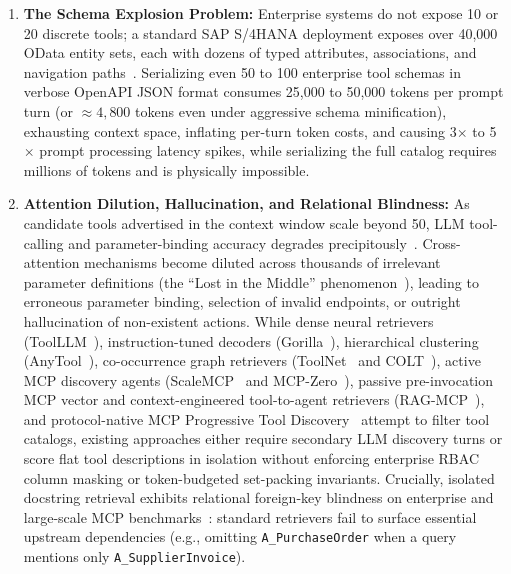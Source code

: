 \documentclass[conference,10pt]{IEEEtran}
\begin{document}
\begin{enumerate}
    \item \textbf{The Schema Explosion Problem:} Enterprise systems do not expose 10 or 20 discrete tools; a standard SAP S/4HANA deployment exposes over 40,000 OData entity sets, each with dozens of typed attributes, associations, and navigation paths~\cite{pizzo2020odata}. Serializing even 50 to 100 enterprise tool schemas in verbose OpenAPI JSON format consumes 25,000 to 50,000 tokens per prompt turn (or $\approx 4{,}800$ tokens even under aggressive schema minification), exhausting context space, inflating per-turn token costs, and causing 3$\times$ to 5$\times$ prompt processing latency spikes, while serializing the full catalog requires millions of tokens and is physically impossible.
    \item \textbf{Attention Dilution, Hallucination, and Relational Blindness:} As candidate tools advertised in the context window scale beyond 50, LLM tool-calling and parameter-binding accuracy degrades precipitously~\cite{liu2024lost, qin2024toolllm, patil2023gorilla}. Cross-attention mechanisms become diluted across thousands of irrelevant parameter definitions (the ``Lost in the Middle'' phenomenon~\cite{liu2024lost}), leading to erroneous parameter binding, selection of invalid endpoints, or outright hallucination of non-existent actions. While dense neural retrievers (ToolLLM~\cite{qin2024toolllm}), instruction-tuned decoders (Gorilla~\cite{patil2023gorilla}), hierarchical clustering (AnyTool~\cite{du2024anytool}), co-occurrence graph retrievers (ToolNet~\cite{liu2024toolnet} and COLT~\cite{qu2024colt}), active MCP discovery agents (ScaleMCP~\cite{lumer2025scalemcp} and MCP-Zero~\cite{fei2025mcpzero}), passive pre-invocation MCP vector and context-engineered tool-to-agent retrievers (RAG-MCP~\cite{gan2025ragmcp}), and protocol-native MCP Progressive Tool Discovery~\cite{anthropic2024mcp} attempt to filter tool catalogs, existing approaches either require secondary LLM discovery turns or score flat tool descriptions in isolation without enforcing enterprise RBAC column masking or token-budgeted set-packing invariants. Crucially, isolated docstring retrieval exhibits relational foreign-key blindness on enterprise and large-scale MCP benchmarks~\cite{huang2025crmarena, luo2025mcpuniverse, wang2025mcpbench, fan2025mcptoolbench}: standard retrievers fail to surface essential upstream dependencies (e.g., omitting \texttt{A\_PurchaseOrder} when a query mentions only \texttt{A\_SupplierInvoice}).

\end{enumerate}
\end{document}
